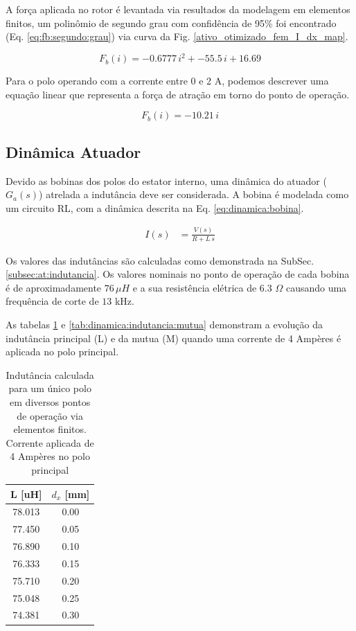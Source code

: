 A força aplicada no rotor é levantada via resultados da modelagem em elementos
finitos, um polinômio de segundo grau com confidência de 95\% foi encontrado
(Eq. \ref{eq:fb:segundo:grau}) via curva da Fig.
\ref{ativo_otimizado_fem_I_dx_map}.

\begin{equation}
     F_b(i) = -0.6777 \, i^2 + -55.5 \, i + 16.69
     \label{eq:fb:segundo:grau}
\end{equation}

Para o polo operando com a corrente entre 0 e 2 A, podemos descrever uma equação linear que representa a força de atração em torno do ponto de operação. 

\begin{equation}
     F_b(i) = -10.21 \, i 
     \label{eq:fb:primeiro:grau}
\end{equation}

\subsection{Dinâmica Atuador}

Devido as bobinas dos polos do estator interno, uma dinâmica do atuador ($G_a(s)$) atrelada a indutância deve ser considerada. A bobina é modelada como um circuito RL, com a dinâmica descrita na Eq. \eqref{eq:dinamica:bobina}.

\begin{align}
	I(s) &= \frac{V(s)}{R + L \, s} 
	\label{eq:dinamica:bobina}
\end{align}

Os valores das indutâncias são calculadas como demonstrada na SubSec. \ref{subsec:at:indutancia}. Os valores nominais no ponto de operação de cada bobina é de aproximadamente $76 \, \mu H$ e a sua resistência elétrica de 6.3 $\Omega$ causando uma frequência de corte de $13$ kHz. 

As tabelas \ref{tab:dinamica:indutancia} e \ref{tab:dinamica:indutancia:mutua} demonstram a evolução da indutância principal (L) e da mutua (M) quando uma corrente de 4 Ampères é aplicada no polo principal. 

\begin{table}[ht!]
	\centering
	\begin{tabular}{c c}
        L [uH]  & $d_x$ [mm] \\
        \hline \hline               
        78.013 & 0.00 \\
        77.450 & 0.05 \\
        76.890 & 0.10 \\
        76.333 & 0.15 \\
        75.710 & 0.20 \\
        75.048 & 0.25 \\
        74.381 & 0.30       
	\end{tabular} 
	\caption{Indutância calculada para um único polo em diversos pontos de operação via elementos finitos. Corrente aplicada de 4 Ampères no polo principal}
	\label{tab:dinamica:indutancia} 
\end{table} 

